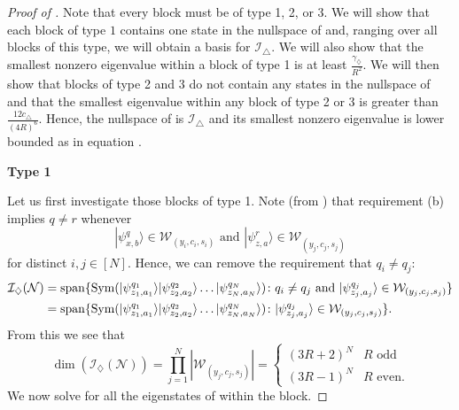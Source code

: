 \documentclass[../thesis-main/thesis-main]{subfiles}
\begin{document}
\begin{proof}[Proof of \protect{}]
Note that every block must be of type 1, 2, or 3.  We will show that each block of type $1$ contains one state in the nullspace of  and, ranging over all blocks of this type, we will obtain a basis for $\mathcal{I}_{\triangle}$. We will also show that the smallest nonzero eigenvalue within a block of type 1 is at least $\frac{\gamma_{\diamondsuit}}{R^{2}}$.  We will then show that blocks of type 2 and 3 do not contain any states in the nullspace of  and that the smallest eigenvalue within any block of type 2 or 3 is greater than $\frac{12c_{\triangle}}{(4R)^6}$. Hence, the nullspace of  is $\mathcal{I}_{\triangle}$ and its smallest nonzero eigenvalue is lower bounded as in equation .

\smallskip
\noindent \textbf{Type 1}
\smallskip

\noindent Let us first investigate those blocks of type 1.  Note (from ) that requirement (b) implies $q\neq r$ whenever 
\begin{equation}
|\psi_{x,b}^{q}\rangle\in\mathcal{W}_{(y_{i},c_{i},s_{i})}\text{ and }|\psi_{z,a}^{r}\rangle\in\mathcal{W}_{(y_{j},c_{j},s_{j})}
\end{equation}
for distinct $i,j\in[N]$. Hence, we can remove the requirement that $q_i\neq q_j$:
\begin{align}
\mathcal{\mathcal{I}_{\diamondsuit}}(\mathcal{N}) & =\operatorname{span}\{ \operatorname{Sym}(|\psi_{z_{1},a_{1}}^{q_{1}}\rangle|\psi_{z_{2},a_{2}}^{q_{2}}\rangle\ldots|\psi_{z_{N},a_{N}}^{q_{N}}\rangle)\colon q_{i}\neq q_{j}\text{ and }|\psi_{z_{j},a_{j}}^{q_{j}}\rangle\in\mathcal{W}_{(y_{j},c_{j},s_{j})}\} \\
 & =\operatorname{span}\{ \operatorname{Sym}(|\psi_{z_{1},a_{1}}^{q_{1}}\rangle|\psi_{z_{2},a_{2}}^{q_{2}}\rangle\ldots|\psi_{z_{N},a_{N}}^{q_{N}}\rangle)\colon|\psi_{z_{j},a_{j}}^{q_{j}}\rangle\in\mathcal{W}_{(y_{j},c_{j},s_{j})}\}.
\end{align}
From this we see that 
\begin{equation}
\dim(\mathcal{I}_{\diamondsuit}(\mathcal{N}))=\prod_{j=1}^{N}\left|{\mathcal{W}_{(y_{j},c_{j},s_{j})}}\right|=\begin{cases}
\left(3R+2\right)^{N} & R\text{ odd}\\
\left(3R-1\right)^{N} & R\text{ even.}
\end{cases}
\end{equation}
We now solve for all the eigenstates of  within the block. 


\end{proof}
\end{document}

